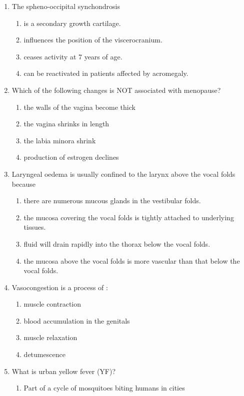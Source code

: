 \documentclass[12pt]{article}
\begin{document}
\begin{enumerate}[label=\arabic*.]
\item The spheno-occipital synchondrosis
\begin{enumerate}[label=(\alph*)]
    \item is a secondary growth cartilage.
    \item influences the position of the viscerocranium.
    \item ceases activity at 7 years of age.
    \item can be reactivated in patients affected by acromegaly.
\end{enumerate}
\item Which of the following changes is NOT associated with menopause?
\begin{enumerate}[label=(\alph*)]
    \item the walls of the vagina become thick
    \item the vagina shrinks in length
    \item the labia minora shrink
    \item production of estrogen declines
\end{enumerate}
\item Laryngeal oedema is usually confined to the larynx above the vocal folds because
\begin{enumerate}[label=(\alph*)]
    \item there are numerous mucous glands in the vestibular folds.
    \item the mucosa covering the vocal folds is tightly attached to underlying tissues.
    \item fluid will drain rapidly into the thorax below the vocal folds.
    \item the mucosa above the vocal folds is more vascular than that below the vocal folds.
\end{enumerate}
\item Vasocongestion is a process of :
\begin{enumerate}[label=(\alph*)]
    \item muscle contraction
    \item blood accumulation in the genitals
    \item muscle relaxation
    \item detumescence
\end{enumerate}
\item What is urban yellow fever (YF)?
\begin{enumerate}[label=(\alph*)]
    \item Part of a cycle of mosquitoes biting humans in cities

\end{enumerate}
\end{enumerate}
\end{document}
